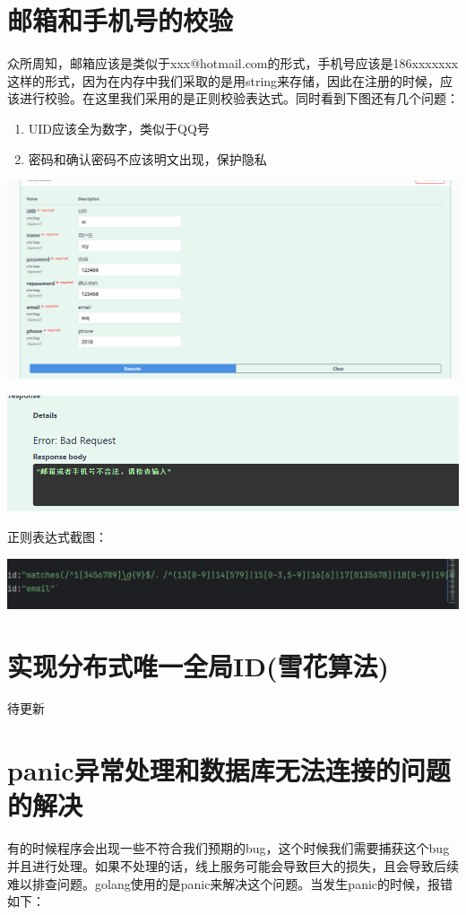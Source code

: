 \documentclass[12pt]{article}
\begin{document}
	
	\section{邮箱和手机号的校验}
	众所周知，邮箱应该是类似于xxx@hotmail.com的形式，手机号应该是186xxxxxxx这样的形式，因为在内存中我们采取的是用string来存储，因此在注册的时候，应该进行校验。在这里我们采用的是正则校验表达式。同时看到下图还有几个问题：
	\begin{enumerate}
		\item UID应该全为数字，类似于QQ号
		\item 密码和确认密码不应该明文出现，保护隐私
	\end{enumerate}
	
	\includegraphics{16.png}
	
	\includegraphics{17.png}
	
	正则表达式截图：
	
	\includegraphics{18.png}
	
	
	
	\section{实现分布式唯一全局ID(雪花算法)}
	待更新
	
	\section{panic异常处理和数据库无法连接的问题的解决}
	有的时候程序会出现一些不符合我们预期的bug，这个时候我们需要捕获这个bug并且进行处理。如果不处理的话，线上服务可能会导致巨大的损失，且会导致后续难以排查问题。golang使用的是panic来解决这个问题。当发生panic的时候，报错如下：
	
\end{document}
